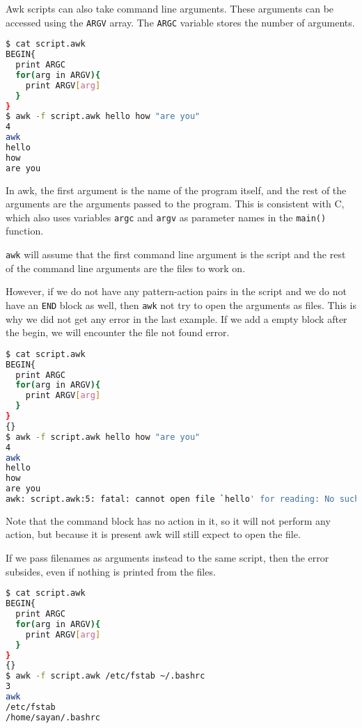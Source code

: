 Awk scripts can also take command line arguments. These arguments can be accessed using the \lstinline|ARGV| array. The \lstinline|ARGC| variable stores the number of arguments.

\begin{lstlisting}[language=bash]
$ cat script.awk
BEGIN{
  print ARGC
  for(arg in ARGV){
    print ARGV[arg]
  }
}
$ awk -f script.awk hello how "are you"
4
awk
hello
how
are you
\end{lstlisting}

In awk, the first argument is the name of the program itself, and the rest of the arguments are the arguments passed to the program.
This is consistent with C, which also uses variables \lstinline|argc| and \lstinline|argv| as parameter names in the \lstinline|main()| function.

\lstinline|awk| will assume that the first command line argument is the script and the rest of the command line arguments are the files to work on.

However, if we do not have any pattern-action pairs in the script and we do not have an \lstinline|END| block as well, then \lstinline|awk| not try to open the arguments as files.
This is why we did not get any error in the last example. If we add a empty block after the begin, we will encounter the file not found error.

\begin{lstlisting}[language=bash]
$ cat script.awk
BEGIN{
  print ARGC
  for(arg in ARGV){
    print ARGV[arg]
  }
}
{}
$ awk -f script.awk hello how "are you"
4
awk
hello
how
are you
awk: script.awk:5: fatal: cannot open file `hello' for reading: No such file or directory
\end{lstlisting}

Note that the command block has no action in it, so it will not perform any action, but because it is present awk will still expect to open the file.

If we pass filenames as arguments instead to the same script, then the error subsides, even if nothing is printed from the files.

\begin{lstlisting}[language=bash]
$ cat script.awk
BEGIN{
  print ARGC
  for(arg in ARGV){
    print ARGV[arg]
  }
}
{}
$ awk -f script.awk /etc/fstab ~/.bashrc
3
awk
/etc/fstab
/home/sayan/.bashrc
\end{lstlisting}

